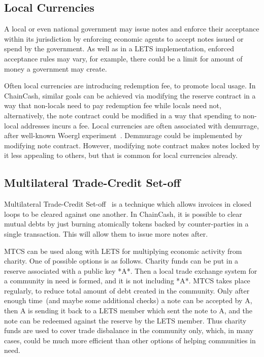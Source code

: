 \documentclass{llncs}   %
\newcommand{\cc}{ChainCash}
\begin{document}
\subsection{Local Currencies}

A local or even national government may issue notes and enforce their acceptance within its jurisdiction by enforcing economic agents to accept notes issued or spend by the government. As well as in a LETS implementation, enforced acceptance rules may vary, for example, there
could be a limit for amount of money a government may create.

Often local currencies are introducing redemption fee, to promote local usage. In \cc{}, similar goals can be achieved via modifying the reserve contract in a way that non-locals need to pay redemption fee while locals need not, alternatively, the note contract could be modified in a way that spending to non-local addresses incurs a fee. Local currencies are often associated with demurrage, after well-known Woergl experiment~\cite{unterguggenbercer1934end}. Demmurage could be implemented by modifying note contract. However, modifying note contract makes notes locked by it less appealing to others, but that is common for local currencies already.

\subsection{Multilateral Trade-Credit Set-off}
\label{mtcs}

Multilateral Trade-Credit Set-off~\cite{bottazzi2024multilateral} is a technique which allows invoices in closed loops to be cleared against one another.
In \cc{}, it is possible to clear mutual debts by just burning atomically tokens backed by counter-parties in a single
transaction. This will allow them to issue more notes after.

MTCS can be used along with LETS for multiplying economic activity from charity. One of possible options is as follows.
Charity funds can be put in a reserve associated with a public key *A*. Then a local trade exchange system for a community
in need is formed, and it is not including *A*. MTCS takes place regularly, to reduce total amount of debt created in the
community. Only after enough time~(and maybe some additional checks) a note can be accepted by A, then A is sending it back to
a LETS member which sent the note to A, and the note can be redeemed against the reserve by the LETS member. Thus
charity funds are used to cover trade disbalance in the community only, which, in many cases, could be much more efficient
than other options of helping communities in need.
\end{document}

